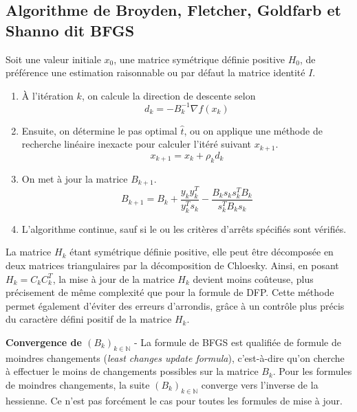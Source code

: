 \documentclass[3p, twocolumn]{elsarticle}
\begin{document}
\subsection{Algorithme de Broyden, Fletcher, Goldfarb et Shanno dit BFGS}
Soit une valeur initiale $x_0$, une matrice symétrique définie positive $H_0$, de préférence une estimation raisonnable ou par défaut la matrice identité $I$. 
\begin{enumerate}
    \item \`A l'itération $k$, on calcule la direction de descente selon
    \begin{equation*}
        d_{k}=-B_{k}^{-1}\nabla f(x_{k})
    \end{equation*}
    \item Ensuite, on détermine le pas optimal $\hat t$, ou on applique une méthode de recherche linéaire inexacte pour calculer l'itéré suivant $x_{k+1}$.
    \begin{equation*}
        x_{k+1}=x_{k}+\rho_{k}d_{k}
    \end{equation*}
    \item On met à jour la matrice $B_{k+1}$.
    \begin{equation*}
        B_{k+1} = B_k + \frac{y_ky_k^T}{y_k^Ts_k}-\frac{B_ks_ks_k^TB_k}{s_k^TB_ks_k}
    \end{equation*}
    \item L'algorithme continue, sauf si le ou les critères d'arrêts spécifiés sont vérifiés.
\end{enumerate}

La matrice $H_{k}$ étant symétrique définie positive, elle peut être décomposée en deux matrices triangulaires par la décomposition de Chloesky. Ainsi, en posant $H_{k}=C_{k}C_{k}^{T}$, la mise à jour de la matrice $H_{k}$ devient moins coûteuse, plus précisement de même complexité que pour la formule de DFP. Cette méthode permet également d'éviter des erreurs d'arrondis, grâce à un contrôle plus précis du caractère défini positif de la matrice $H_{k}$.

\begin{rmk}
    \textbf{Convergence de $(B_k)_{k\in \mathbb{N}}$} - La formule de BFGS est qualifiée de formule de moindres changements (\textit{least changes update formula}), c'est-à-dire qu'on cherche à effectuer le moins de changements possibles sur la matrice $B_k$. Pour les formules de moindres changements, la suite $(B_k)_{k\in \mathbb{N}}$ converge vers l'inverse de la hessienne. Ce n'est pas forcément le cas pour toutes les formules de mise à jour. 
\end{rmk}
\end{document}
